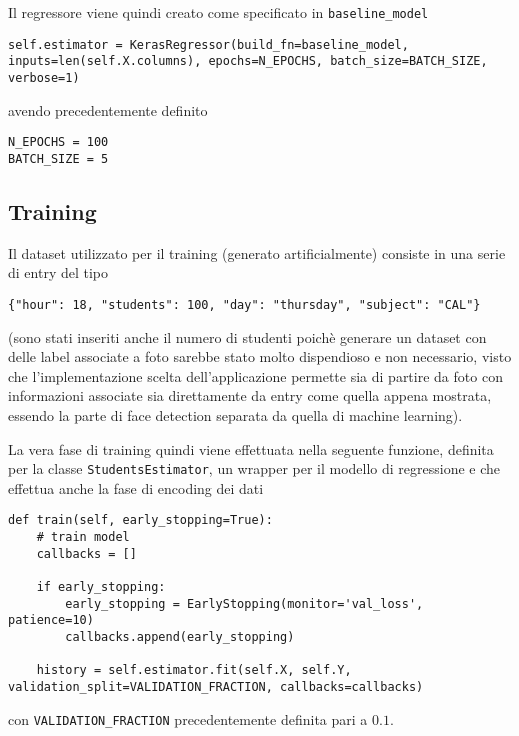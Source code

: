 Il regressore viene quindi creato come specificato in \lstinline{baseline_model}

\begin{verbatim}
self.estimator = KerasRegressor(build_fn=baseline_model, inputs=len(self.X.columns), epochs=N_EPOCHS, batch_size=BATCH_SIZE, verbose=1)
\end{verbatim}

avendo precedentemente definito

\begin{verbatim}
N_EPOCHS = 100
BATCH_SIZE = 5
\end{verbatim}

\subsection{Training} %
\label{sub:methods_ml_training}

Il dataset utilizzato per il training (generato artificialmente) consiste in una serie di entry del 
tipo

\begin{verbatim}
{"hour": 18, "students": 100, "day": "thursday", "subject": "CAL"}
\end{verbatim} 

(sono stati inseriti anche il numero di studenti poichè generare un dataset con delle label 
associate a foto sarebbe stato molto dispendioso e non necessario, visto che l'implementazione
scelta dell'applicazione permette sia di partire da foto con informazioni associate sia direttamente 
da entry come quella appena mostrata, essendo la parte di face detection separata da quella di 
machine learning).

La vera fase di training quindi viene effettuata nella seguente funzione, definita per la classe 
\lstinline{StudentsEstimator}, un wrapper per il modello di regressione e che effettua anche la fase
di encoding dei dati

\begin{verbatim}
def train(self, early_stopping=True):
    # train model
    callbacks = []

    if early_stopping:
        early_stopping = EarlyStopping(monitor='val_loss', patience=10)
        callbacks.append(early_stopping)

    history = self.estimator.fit(self.X, self.Y, validation_split=VALIDATION_FRACTION, callbacks=callbacks)
\end{verbatim} 
\noindent
con \lstinline{VALIDATION_FRACTION} precedentemente definita pari a $0.1$. 

